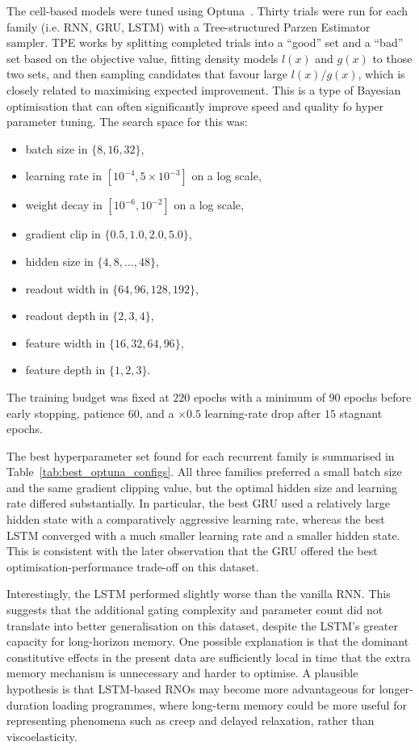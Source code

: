 \documentclass[11pt,a4paper, onecolumn]{article}
\begin{document}
The cell-based models were tuned using Optuna~\cite{optuna_2019}. Thirty trials were run for each family (i.e. RNN, GRU, LSTM) with a Tree-structured Parzen Estimator sampler. TPE works by splitting completed trials into a ``good'' set and a ``bad'' set based on the objective value, fitting density models $l(x)$ and $g(x)$ to those two sets, and then sampling candidates that favour large $l(x)/g(x)$, which is closely related to maximising expected improvement. This is a type of Bayesian optimisation that can often significantly improve speed and quality fo hyper parameter tuning. The search space for this was:
\begin{itemize}[leftmargin=1.5em]
    \item batch size in $\{8,16,32\}$,
    \item learning rate in $[10^{-4},5\times 10^{-3}]$ on a log scale,
    \item weight decay in $[10^{-6},10^{-2}]$ on a log scale,
    \item gradient clip in $\{0.5,1.0,2.0,5.0\}$,
    \item hidden size in $\{4,8,\dots,48\}$,
    \item readout width in $\{64,96,128,192\}$,
    \item readout depth in $\{2,3,4\}$,
    \item feature width in $\{16,32,64,96\}$,
    \item feature depth in $\{1,2,3\}$.
\end{itemize}
The training budget was fixed at $220$ epochs with a minimum of $90$ epochs before early stopping, patience $60$, and a $\times 0.5$ learning-rate drop after $15$ stagnant epochs.

The best hyperparameter set found for each recurrent family is summarised in Table~\ref{tab:best_optuna_configs}. All three families preferred a small batch size and the same gradient clipping value, but the optimal hidden size and learning rate differed substantially. In particular, the best GRU used a relatively large hidden state with a comparatively aggressive learning rate, whereas the best LSTM converged with a much smaller learning rate and a smaller hidden state. This is consistent with the later observation that the GRU offered the best optimisation-performance trade-off on this dataset. 

Interestingly, the LSTM performed slightly worse than the vanilla RNN. This suggests that the additional gating complexity and parameter count did not translate into better generalisation on this dataset, despite the LSTM's greater capacity for long-horizon memory. One possible explanation is that the dominant constitutive effects in the present data are sufficiently local in time that the extra memory mechanism is unnecessary and harder to optimise. A plausible hypothesis is that LSTM-based RNOs may become more advantageous for longer-duration loading programmes, where long-term memory could be more useful for representing phenomena such as creep and delayed relaxation, rather than viscoelasticity.
\end{document}
